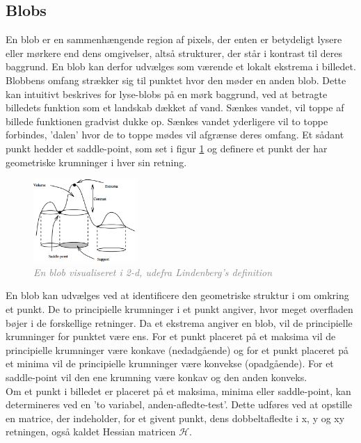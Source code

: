 \subsection{Blobs}\label{sec:blobs}
En blob er en sammenhængende region af pixels, der enten er betydeligt lysere eller mørkere end dens omgivelser, altså strukturer, der står i kontrast til deres baggrund. En blob kan derfor udvælges som værende et lokalt ekstrema i billedet. Blobbens omfang strækker sig til punktet hvor den møder en anden blob. Dette kan intuitivt beskrives for lyse-blobs på en mørk baggrund, ved at betragte billedets funktion som et landskab dækket af vand. Sænkes vandet, vil toppe af billede funktionen gradvist dukke op. Sænkes vandet yderligere vil to toppe forbindes, 'dalen' hvor de to toppe mødes vil afgrænse deres omfang. Et sådant punkt hedder et saddle-point, som set i figur \ref{fig:lindblob} og definere et punkt der har geometriske krumninger i hver sin retning.
\begin{figure}[H]
    \centering
    \includegraphics[width=0.35\textwidth]{fig/11.png}
    \vspace{-0.5em}   
    \begin{center}
    \caption{\textcolor{gray}{\footnotesize \textit{
    En blob visualiseret i 2-d, udefra Lindenberg's definition \cite{blob}}}}
    \label{fig:lindblob}
     \end{center}
  \end{figure}
       \vspace{-2.7em}
\noindent
En blob kan udvælges ved at identificere den geometriske struktur i om omkring et punkt. De to principielle krumninger i et punkt angiver, hvor meget overfladen bøjer i de forskellige retninger. Da et ekstrema angiver en blob, vil de principielle krumninger for punktet være ens. For et punkt placeret på et maksima vil de principielle krumninger være konkave (nedadgående) og for et punkt placeret på et minima vil de principielle krumninger være konvekse (opadgående). For et saddle-point vil den ene krumning være konkav og den anden konveks. \\ 
Om et punkt i billedet er placeret på et maksima, minima eller saddle-point, kan determineres ved en 'to variabel, anden-afledte-test'. Dette udføres ved at opstille en matrice, der indeholder, for et givent punkt, dens dobbeltafledte i x, y og xy retningen, også kaldet Hessian matricen $\mathcal{H}$.
